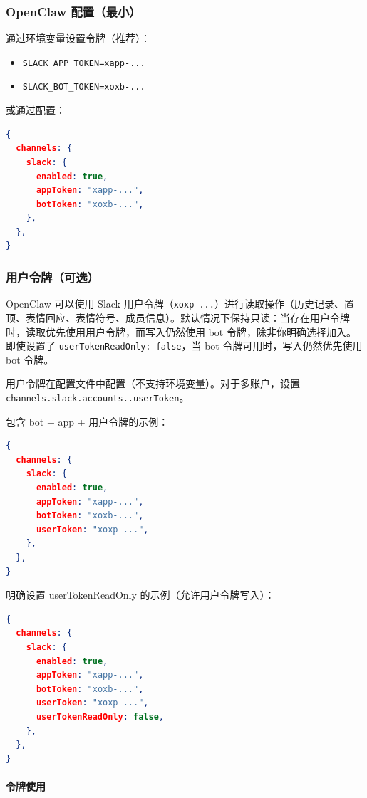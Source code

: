 \subsubsection{OpenClaw 配置（最小）}


通过环境变量设置令牌（推荐）：

\begin{itemize}
  \item \texttt{SLACK\_APP\_TOKEN=xapp-...}
  \item \texttt{SLACK\_BOT\_TOKEN=xoxb-...}
\end{itemize}


或通过配置：

\begin{lstlisting}[language=json]
{
  channels: {
    slack: {
      enabled: true,
      appToken: "xapp-...",
      botToken: "xoxb-...",
    },
  },
}
\end{lstlisting}


\subsubsection{用户令牌（可选）}


OpenClaw 可以使用 Slack 用户令牌（\texttt{xoxp-...}）进行读取操作（历史记录、置顶、表情回应、表情符号、成员信息）。默认情况下保持只读：当存在用户令牌时，读取优先使用用户令牌，而写入仍然使用 bot 令牌，除非你明确选择加入。即使设置了 \texttt{userTokenReadOnly: false}，当 bot 令牌可用时，写入仍然优先使用 bot 令牌。

用户令牌在配置文件中配置（不支持环境变量）。对于多账户，设置 \texttt{channels.slack.accounts..userToken}。

包含 bot + app + 用户令牌的示例：

\begin{lstlisting}[language=json]
{
  channels: {
    slack: {
      enabled: true,
      appToken: "xapp-...",
      botToken: "xoxb-...",
      userToken: "xoxp-...",
    },
  },
}
\end{lstlisting}


明确设置 userTokenReadOnly 的示例（允许用户令牌写入）：

\begin{lstlisting}[language=json]
{
  channels: {
    slack: {
      enabled: true,
      appToken: "xapp-...",
      botToken: "xoxb-...",
      userToken: "xoxp-...",
      userTokenReadOnly: false,
    },
  },
}
\end{lstlisting}


\paragraph{令牌使用}


